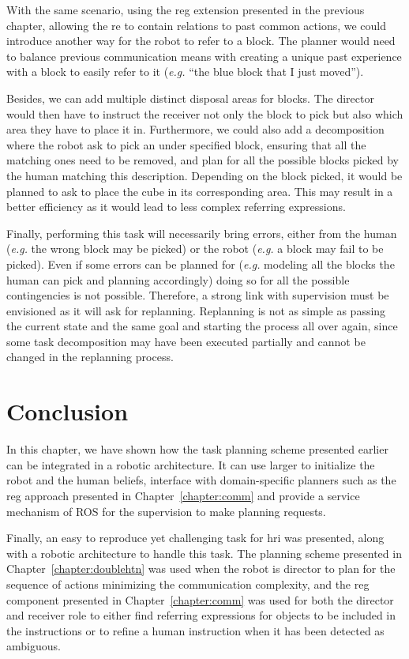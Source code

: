 \documentclass[a4paper,11pt,twoside]{StyleThese}
\begin{document}
With the same scenario, using the \acrshort{reg} extension presented in the previous chapter, allowing the \acrshort{re} to contain relations to past common actions, we could introduce another way for the robot to refer to a block. The planner would need to balance previous communication means with creating a unique past experience with a block to easily refer to it (\textit{e.g.} ``the blue block that I just moved'').

Besides, we can add multiple distinct disposal areas for blocks. The director would then have to instruct the receiver not only the block to pick but also which area they have to place it in. Furthermore, we could also add a decomposition where the robot ask to pick an under specified block, ensuring that all the matching ones need to be removed, and plan for all the possible blocks picked by the human matching this description. Depending on the block picked, it would be planned to ask to place the cube in its corresponding area. This may result in a better efficiency as it would lead to less complex referring expressions.

Finally, performing this task will necessarily bring errors, either from the human (\textit{e.g.} the wrong block may be picked) or the robot (\textit{e.g.} a block may fail to be picked). Even if some errors can be planned for (\textit{e.g.} modeling all the blocks the human can pick and planning accordingly) doing so for all the possible contingencies is not possible. Therefore, a strong link with supervision must be envisioned as it will ask for replanning. Replanning is not as simple as passing the current state and the same goal and starting the process all over again, since some task decomposition may have been executed partially and cannot be changed in the replanning process.


\section{Conclusion}
In this chapter, we have shown how the task planning scheme presented earlier can be integrated in a robotic architecture. It can use larger  to initialize the robot and the human beliefs, interface with domain-specific planners such as the \acrshort{reg} approach presented in Chapter~\ref{chapter:comm} and provide a service mechanism of ROS for the supervision to make planning requests.

Finally, an easy to reproduce yet challenging task for \acrshort{hri} was presented, along with a robotic architecture to handle this task. The planning scheme presented in Chapter~\ref{chapter:doublehtn} was used when the robot is director to plan for the sequence of actions minimizing the communication complexity, and the \acrshort{reg} component presented in Chapter~\ref{chapter:comm} was used for both the director and receiver role to either find referring expressions for objects to be included in the instructions or to refine a human instruction when it has been detected as ambiguous.

\ifdefined{}
\else


\end{document}
